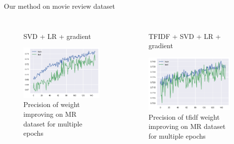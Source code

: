 \documentclass[xcolor={table}]{beamer}
\begin{document}
\begin{frame}{Our method on movie review dataset}
    \begin{columns}
                   \begin{figure}[H]
                    \centering
                    \caption*{SVD + LR + gradient}
                    \includegraphics[height=0.4\textheight]{images/MRDataset_grad.png}
                    \caption{Precision of weight improving on MR dataset for multiple epochs}
                \end{figure}

                \begin{figure}[H]
                    \centering
                    \caption*{TFIDF + SVD + LR + gradient}
                    \includegraphics[height=0.4\textheight]{images/MRDataset_tfidf_grad.png}
                    \caption{Precision of tfidf weight improving on MR dataset for multiple epochs}
                \end{figure}
    \end{columns}                
\end{frame} 
\end{document}
